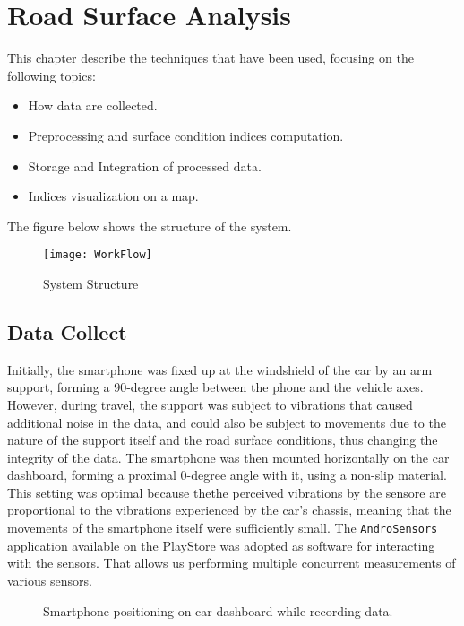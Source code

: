 \documentclass[tesi]{subfiles}
\begin{document}
\chapter{Road Surface Analysis}
\label{ch:System Development}
This chapter describe the techniques that have been used, focusing on the following topics:

\begin{itemize}
\item How data are collected.
\item Preprocessing and surface condition indices computation.
\item Storage and Integration of processed data.
\item Indices visualization on a map.
\end{itemize}

The figure below shows the structure of the system.
\begin{figure}[H]
\centering
\texttt{[image: WorkFlow]}
\caption{System Structure}

\end{figure}\label{fig:System Structure}

\section{Data Collect}\label{sc:Data Collect}
Initially, the smartphone was fixed up at the windshield of the car by an arm support, forming a $90$-degree angle between the phone and the vehicle axes.
However, during travel, the support was subject to vibrations that caused additional noise in the data, and could also be subject to movements due to the nature of the support itself and the road surface conditions, thus changing the integrity of the data.
The smartphone was then mounted horizontally on the car dashboard, forming a proximal $0$-degree angle with it, using a non-slip material. This setting was optimal because thethe perceived vibrations by the sensore are proportional to the vibrations experienced by the car's chassis, meaning that the movements of the smartphone itself were sufficiently small.
The \texttt{AndroSensors} application available on the PlayStore was adopted as software for interacting with the sensors. That allows us  performing multiple concurrent measurements of various sensors.

\begin{figure}[H]
 \centering

  
  
  \caption{Smartphone positioning on car dashboard while recording data.}
\end{figure}\label{fig:Smarphone Data Recording}
\end{document}
